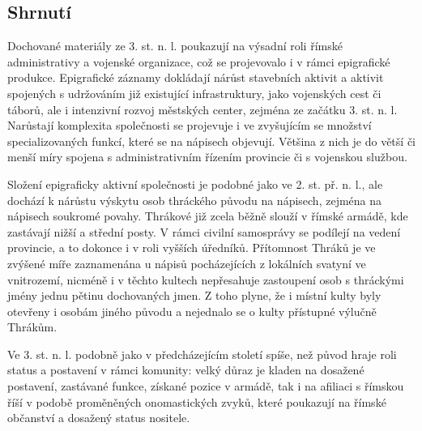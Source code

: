 
\subsection[shrnutí-19]{Shrnutí}

Dochované materiály ze 3. st. n. l. poukazují na výsadní roli římské administrativy a vojenské organizace, což se projevovalo i v rámci epigrafické produkce. Epigrafické záznamy dokládají nárůst stavebních aktivit a aktivit spojených s udržováním již existující infrastruktury, jako vojenských cest či táborů, ale i intenzivní rozvoj městských center, zejména ze začátku 3. st. n. l. Narůstají komplexita společnosti se projevuje i ve zvyšujícím se množství specializovaných funkcí, které se na nápisech objevují. Většina z nich je do větší či menší míry spojena s administrativním řízením provincie či s vojenskou službou.

Složení epigraficky aktivní společnosti je podobné jako ve 2. st. př. n. l., ale dochází k nárůstu výskytu osob thráckého původu na nápisech, zejména na nápisech soukromé povahy. Thrákové již zcela běžně slouží v římské armádě, kde zastávají nižší a střední posty. V rámci civilní samosprávy se podílejí na vedení provincie, a to dokonce i v roli vyšších úředníků. Přítomnost Thráků je ve zvýšené míře zaznamenána u nápisů pocházejících z lokálních svatyní ve vnitrozemí, nicméně i v těchto kultech nepřesahuje zastoupení osob s thráckými jmény jednu pětinu dochovaných jmen. Z toho plyne, že i místní kulty byly otevřeny i osobám jiného původu a nejednalo se o kulty přístupné výlučně Thrákům.

Ve 3. st. n. l. podobně jako v předcházejícím století spíše, než původ hraje roli status a postavení v rámci komunity: velký důraz je kladen na dosažené postavení, zastávané funkce, získané pozice v armádě, tak i na afiliaci s římskou říší v podobě proměněných onomastických zvyků, které poukazují na římské občanství a dosažený status nositele.

